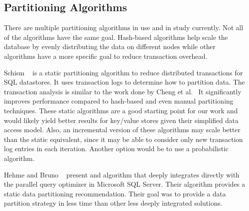 \subsection{Partitioning Algorithms}
There are multiple partitioning algorithms in use and in study currently.  Not all of the algorithms have the same goal.  Hash-based algorithms help scale the database by evenly distributing the data on different nodes while other algorithms have a more specific goal to reduce transaction overhead.

Schism ~\cite{Curino:2010:SWA:1920841.1920853} is a static partitioning algorithm to reduce distributed transactions for SQL datastores. It uses transaction logs to determine how to partition data. The transaction analysis is similar to the work done by Cheng et al.~\cite{Cheng:2002} It significantly improves performance compared to hash-based and even manual partitioning techniques. These static algorithms are a good starting point for our work and would likely yield better results for key/value stores given their simplified data access model. Also, an incremental version of these algorithms may scale better than the static equivalent, since it may be able to consider only new transaction log entries in each iteration. Another option would be to use a probabilistic algorithm.

Hehme and Bruno ~\cite{Nehme:2011:APD:1989323.1989444} present and algorithm that deeply integrates directly with the parallel query optimizer in Microsoft SQL Server.  Their algorithm provides a static data partitioning recommendation.  Their goal was to provide a data partition strategy in less time than other less deeply integrated solutions.
